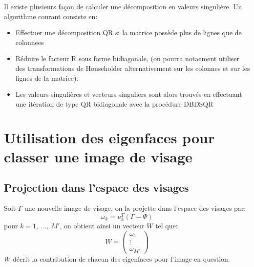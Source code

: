 \documentclass[12pt,french]{article}
\theoremstyle{plain}
\theoremstyle{definition}
\begin{document}
Il existe plusieurs façon de calculer une décomposition en valeurs singulière. Un algorithme courant consiste en:
\begin{itemize}
\item Effectuer une décomposition QR si la matrice possède plus de lignes que de colonnees
\item Réduire le facteur R sous forme bidiagonale, (on pourra notaement utiliser des transformations de Householder alternativement sur les colonnes et sur les lignes de la matrice).
\item Les valeurs singulières et vecteurs singuliers sont alors trouvés en effectuant une itération de type QR bidiagonale avec la procédure DBDSQR
\end{itemize}

\section{Utilisation des eigenfaces pour classer une image de visage}

\subsection{Projection dans l'espace des visages}
Soit $\Gamma$ une nouvelle image de visage, on la projette dans l'espace des visages par:
$$\omega_k = u_k^T(\Gamma - \Psi)$$
pour $k = 1,~\dots,~M'$, on obtient ainsi un vecteur $W$ tel que:
\[W =
  \begin{pmatrix}
    \omega_1 \\
    \vdots \\
    \omega_{M'}
  \end{pmatrix}
\]
$W$ décrit la contribution de chacun des eigenfaces pour l'image en question.
\end{document}
